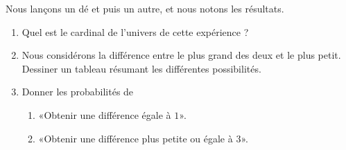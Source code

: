 
\begin{exercice}\label{exosmath-0357}

    Nous lançons un dé et puis un autre, et nous notons les résultats.
    \begin{enumerate}
        \item
            Quel est le cardinal de l'univers de cette expérience ?
        \item
            Nous considérons la différence entre le plus grand des deux et le plus petit. Dessiner un tableau résumant les différentes possibilités.
        \item
            Donner les probabilités de
            \begin{enumerate}
                \item
                    «Obtenir une différence égale à \( 1\)».
                \item
                    «Obtenir une différence plus petite ou égale à 3».
            \end{enumerate}
    \end{enumerate}

\end{exercice}

